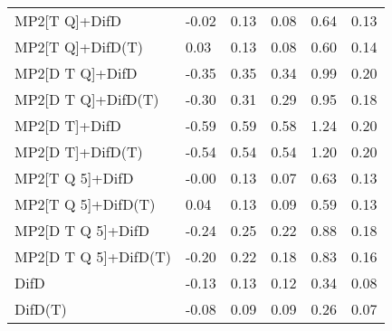 \begin{table}
\begin{tabular}{l l l l l l }
    MP2[T Q]+DifD & -0.02 & 0.13 & 0.08 & 0.64 & 0.13 \\ 
    MP2[T Q]+DifD(T) & 0.03 & 0.13 & 0.08 & 0.60 & 0.14 \\ 
    MP2[D T Q]+DifD & -0.35 & 0.35 & 0.34 & 0.99 & 0.20 \\ 
    MP2[D T Q]+DifD(T) & -0.30 & 0.31 & 0.29 & 0.95 & 0.18 \\ 
    MP2[D T]+DifD & -0.59 & 0.59 & 0.58 & 1.24 & 0.20 \\ 
    MP2[D T]+DifD(T) & -0.54 & 0.54 & 0.54 & 1.20 & 0.20 \\ 
    MP2[T Q 5]+DifD & -0.00 & 0.13 & 0.07 & 0.63 & 0.13 \\ 
    MP2[T Q 5]+DifD(T) & 0.04 & 0.13 & 0.09 & 0.59 & 0.13 \\ 
    MP2[D T Q 5]+DifD & -0.24 & 0.25 & 0.22 & 0.88 & 0.18 \\ 
    MP2[D T Q 5]+DifD(T) & -0.20 & 0.22 & 0.18 & 0.83 & 0.16 \\ 
    DifD & -0.13 & 0.13 & 0.12 & 0.34 & 0.08 \\ 
    DifD(T) & -0.08 & 0.09 & 0.09 & 0.26 & 0.07 \\ 
    \bottomrule
  \end{tabular}
\end{table}
